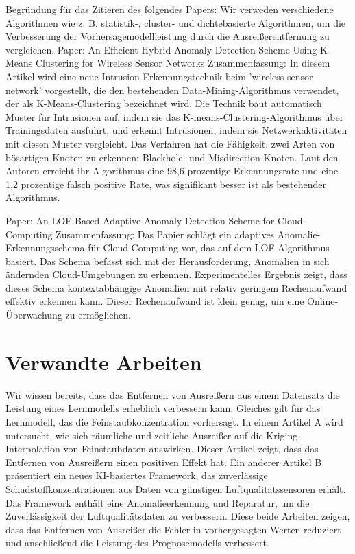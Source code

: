 Begründung für das Zitieren des folgendes Papers: Wir verweden verschiedene Algorithmen wie z. B. statistik-, cluster- und dichtebasierte Algorithmen, um die Verbesserung der Vorhersagemodellleistung durch die Ausreißerentfernung zu vergleichen.
Paper: An Efficient Hybrid Anomaly Detection Scheme Using K-Means Clustering for Wireless Sensor Networks
Zusammenfassung: In diesem Artikel wird eine neue Intrusion-Erkennungstechnik beim 'wireless sensor network' vorgestellt, die den bestehenden Data-Mining-Algorithmus verwendet, der als K-Means-Clustering bezeichnet wird. Die Technik baut automatisch Muster für Intrusionen auf, indem sie das K-means-Clustering-Algorithmus über Trainingsdaten ausführt, und erkennt Intrusionen, indem sie Netzwerkaktivitäten mit diesen Muster vergleicht. Das Verfahren hat die Fähigkeit, zwei Arten von bösartigen Knoten zu erkennen: Blackhole- und Misdirection-Knoten. Laut den Autoren erreicht ihr Algorithmus eine 98,6 prozentige Erkennungsrate und eine 1,2 prozentige falsch positive Rate, was signifikant besser ist als bestehender Algorithmus.

Paper: An LOF-Based Adaptive Anomaly Detection Scheme for Cloud Computing
Zusammenfassung: Das Papier schlägt ein adaptives Anomalie-Erkennungsschema für Cloud-Computing vor, das auf dem LOF-Algorithmus basiert. Das Schema befasst sich mit der Herausforderung, Anomalien in sich ändernden Cloud-Umgebungen zu erkennen. Experimentelles Ergebnis zeigt, dass dieses Schema kontextabhängige Anomalien mit relativ geringem Rechenaufwand effektiv erkennen kann. Dieser Rechenaufwand ist klein genug, um eine Online-Überwachung zu ermöglichen.

\chapterpage\chapter{Verwandte Arbeiten}
	Wir wissen bereits, dass das Entfernen von Ausreißern aus einem Datensatz die Leistung eines Lernmodells erheblich verbessern kann. Gleiches gilt für das Lernmodell, das die Feinstaubkonzentration vorhersagt. In einem Artikel A wird untersucht, wie sich räumliche und zeitliche Ausreißer auf die Kriging-Interpolation von Feinstaubdaten auswirken. Dieser Artikel zeigt, dass das Entfernen von Ausreißern einen positiven Effekt hat. Ein anderer Artikel B präsentiert ein neues KI-basiertes Framework, das zuverlässige Schadstoffkonzentrationen aus Daten von günstigen Luftqualitätssensoren erhält. Das Framework enthält eine Anomalieerkennung und Reparatur, um die Zuverlässigkeit der Luftqualitätsdaten zu verbessern. Diese beide Arbeiten zeigen, dass das Entfernen von Ausreißer die Fehler in vorhergesagten Werten reduziert und anschließend die Leistung des Prognosemodells verbessert.

